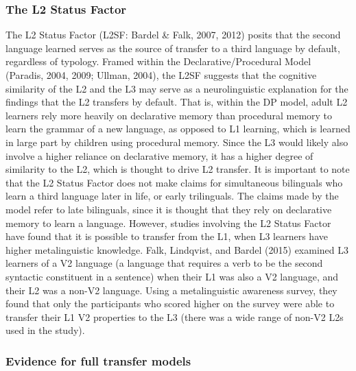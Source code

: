 \documentclass[
  man]{apa6}
\begin{document}
\hypertarget{the-l2-status-factor}{%
\subsubsection{The L2 Status Factor}\label{the-l2-status-factor}}

The L2 Status Factor (L2SF: Bardel \& Falk, 2007, 2012) posits that the second language learned serves as the source of transfer to a third language by default, regardless of typology.
Framed within the Declarative/Procedural Model (Paradis, 2004, 2009; Ullman, 2004), the L2SF suggests that the cognitive similarity of the L2 and the L3 may serve as a neurolinguistic explanation for the findings that the L2 transfers by default.
That is, within the DP model, adult L2 learners rely more heavily on declarative memory than procedural memory to learn the grammar of a new language, as opposed to L1 learning, which is learned in large part by children using procedural memory.
Since the L3 would likely also involve a higher reliance on declarative memory, it has a higher degree of similarity to the L2, which is thought to drive L2 transfer.
It is important to note that the L2 Status Factor does not make claims for simultaneous bilinguals who learn a third language later in life, or early trilinguals.
The claims made by the model refer to late bilinguals, since it is thought that they rely on declarative memory to learn a language.
However, studies involving the L2 Status Factor have found that it is possible to transfer from the L1, when L3 learners have higher metalinguistic knowledge.
Falk, Lindqvist, and Bardel (2015) examined L3 learners of a V2 language (a language that requires a verb to be the second syntactic constituent in a sentence) when their L1 was also a V2 language, and their L2 was a non-V2 language.
Using a metalinguistic awareness survey, they found that only the participants who scored higher on the survey were able to transfer their L1 V2 properties to the L3 (there was a wide range of non-V2 L2s used in the study).

\hypertarget{evidence-for-full-transfer-models}{%
\subsubsection{Evidence for full transfer models}\label{evidence-for-full-transfer-models}}
\end{document}
